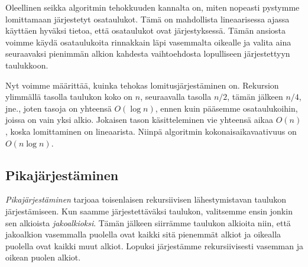 Oleellinen seikka algoritmin tehokkuuden kannalta on,
miten nopeasti pystymme lomittamaan järjestetyt osataulukot.
Tämä on mahdollista lineaarisessa ajassa käyttäen hyväksi tietoa,
että osataulukot ovat järjestyksessä.
Tämän ansiosta voimme käydä osataulukoita rinnakkain läpi
vasemmalta oikealle ja valita aina seuraavaksi pienimmän alkion
kahdesta vaihtoehdosta lopulliseen järjestettyyn taulukkoon.

Nyt voimme määrittää, kuinka tehokas lomitusjärjestäminen on.
Rekursion ylimmällä tasolla taulukon koko on $n$,
seuraavalla tasolla $n/2$, tämän jälkeen $n/4$, jne.,
joten tasoja on yhteensä $O(\log n)$, ennen kuin pääsemme
osataulukoihin, joissa on vain yksi alkio.
Jokaisen tason käsitteleminen vie yhteensä aikaa $O(n)$,
koska lomittaminen on lineaarista.
Niinpä algoritmin kokonaisaikavaativuus on $O(n \log n)$.

\subsection{Pikajärjestäminen}

\emph{Pikajärjestäminen} tarjoaa toisenlaisen rekursiivisen
lähestymistavan taulukon järjestämiseen.
Kun saamme järjestettäväksi taulukon, valitsemme ensin jonkin
sen alkioista \emph{jakoalkioksi}.
Tämän jälkeen siirrämme taulukon alkioita niin,
että jakoalkion vasemmalla puolella ovat kaikki sitä pienemmät alkiot
ja oikealla puolella ovat kaikki muut alkiot.
Lopuksi järjestämme rekursiivisesti vasemman ja oikean puolen alkiot.

